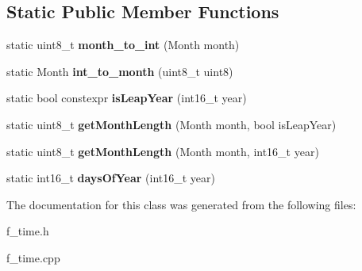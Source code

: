 \subsection*{Static Public Member Functions}
\begin{DoxyCompactItemize}
\item 
\mbox{\label{classtime_1_1_human_time_a257ccea82eb20e57a75865e9d5da1993}} 
static uint8\+\_\+t {\bfseries month\+\_\+to\+\_\+int} (Month month)
\item 
\mbox{\label{classtime_1_1_human_time_a764d51e5b68ed975a46a662bd399aa37}} 
static Month {\bfseries int\+\_\+to\+\_\+month} (uint8\+\_\+t uint8)
\item 
\mbox{\label{classtime_1_1_human_time_ad30d70022fa115ebe17ffb054b3c4f82}} 
static bool constexpr {\bfseries is\+Leap\+Year} (int16\+\_\+t year)
\item 
\mbox{\label{classtime_1_1_human_time_ab0006d75c9791e5639b4520f4de75f91}} 
static uint8\+\_\+t {\bfseries get\+Month\+Length} (Month month, bool is\+Leap\+Year)
\item 
\mbox{\label{classtime_1_1_human_time_a8e1d91ca60e4dbc24e5d661105458ac6}} 
static uint8\+\_\+t {\bfseries get\+Month\+Length} (Month month, int16\+\_\+t year)
\item 
\mbox{\label{classtime_1_1_human_time_a0fc5377aa7e5085afb09acf9f7fc0920}} 
static int16\+\_\+t {\bfseries days\+Of\+Year} (int16\+\_\+t year)
\end{DoxyCompactItemize}


The documentation for this class was generated from the following files\+:\begin{DoxyCompactItemize}
\item 
f\+\_\+time.\+h\item 
f\+\_\+time.\+cpp\end{DoxyCompactItemize}
